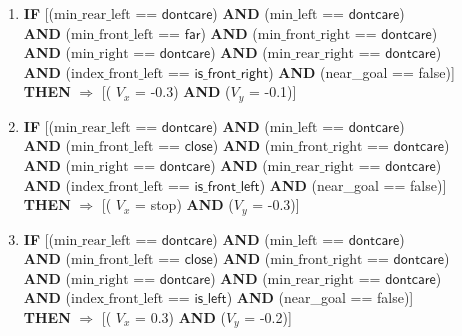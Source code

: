 \begin{enumerate}
	\item \textbf{IF} [($\text{min\_rear\_left}$ == $\textsf{dontcare}$) 
	\textbf{AND} ($\text{min\_left}$ == $\textsf{dontcare}$)\\
	\textbf{AND} ($\text{min\_front\_left}$ == $\textsf{far}$)
	\textbf{AND} ($\text{min\_front\_right}$ == $\textsf{dontcare}$)\\
	\textbf{AND} ($\text{min\_right}$ == $\textsf{dontcare}$) 
	\textbf{AND} ($\text{min\_rear\_right}$ == $\textsf{dontcare}$) \\
	\textbf{AND} ($\text{index\_front\_left}$ == $\textsf{is\_front\_right}$)
	\textbf{AND} (near\_goal == \textsf{false})]\\
	\textbf{THEN} $\Rightarrow$ [( $V_x$ = \textsf{-0.3}) \textbf{AND} ($V_y$ = \textsf{-0.1})]
	
	\item \textbf{IF} [($\text{min\_rear\_left}$ == $\textsf{dontcare}$) 
	\textbf{AND} ($\text{min\_left}$ == $\textsf{dontcare}$)\\
	\textbf{AND} ($\text{min\_front\_left}$ == $\textsf{close}$)
	\textbf{AND} ($\text{min\_front\_right}$ == $\textsf{dontcare}$)\\
	\textbf{AND} ($\text{min\_right}$ == $\textsf{dontcare}$) 
	\textbf{AND} ($\text{min\_rear\_right}$ == $\textsf{dontcare}$) \\
	\textbf{AND} ($\text{index\_front\_left}$ == $\textsf{is\_front\_left}$)
	\textbf{AND} (near\_goal == \textsf{false})]\\
	\textbf{THEN} $\Rightarrow$ [( $V_x$ = \textsf{stop}) \textbf{AND} ($V_y$ = \textsf{-0.3})]
	
	\item \textbf{IF} [($\text{min\_rear\_left}$ == $\textsf{dontcare}$) 
	\textbf{AND} ($\text{min\_left}$ == $\textsf{dontcare}$)\\
	\textbf{AND} ($\text{min\_front\_left}$ == $\textsf{close}$)
	\textbf{AND} ($\text{min\_front\_right}$ == $\textsf{dontcare}$)\\
	\textbf{AND} ($\text{min\_right}$ == $\textsf{dontcare}$) 
	\textbf{AND} ($\text{min\_rear\_right}$ == $\textsf{dontcare}$) \\
	\textbf{AND} ($\text{index\_front\_left}$ == $\textsf{is\_left}$)
	\textbf{AND} (near\_goal == \textsf{false})]\\
	\textbf{THEN} $\Rightarrow$ [( $V_x$ = \textsf{0.3}) \textbf{AND} ($V_y$ = \textsf{-0.2})]
	

\end{enumerate}
